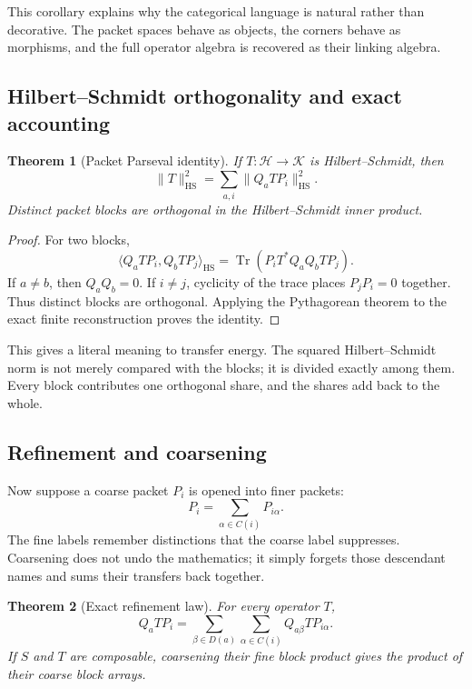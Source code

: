 \documentclass[11pt]{article}
\newtheorem{theorem}{Theorem}[section]
\theoremstyle{definition}
\theoremstyle{remark}
\begin{document}
This corollary explains why the categorical language is natural rather than decorative.  The packet spaces behave as objects, the corners behave as morphisms, and the full operator algebra is recovered as their linking algebra.

\subsection{Hilbert--Schmidt orthogonality and exact accounting}

\begin{theorem}[Packet Parseval identity]
If \(T:\mathcal H\to\mathcal K\) is Hilbert--Schmidt, then
\[
\boxed{
\|T\|_{\mathrm{HS}}^2
=
\sum_{a,i}\|Q_aTP_i\|_{\mathrm{HS}}^2.
}
\]
Distinct packet blocks are orthogonal in the Hilbert--Schmidt inner product.
\end{theorem}

\begin{proof}
For two blocks,
\[
\langle Q_aTP_i,Q_bTP_j\rangle_{\mathrm{HS}}
=
\operatorname{Tr}
\left(P_iT^*Q_aQ_bTP_j\right).
\]
If \(a\ne b\), then \(Q_aQ_b=0\).  If \(i\ne j\), cyclicity of the trace places \(P_jP_i=0\) together.  Thus distinct blocks are orthogonal.  Applying the Pythagorean theorem to the exact finite reconstruction proves the identity.
\end{proof}

This gives a literal meaning to transfer energy.  The squared Hilbert--Schmidt norm is not merely compared with the blocks; it is divided exactly among them.  Every block contributes one orthogonal share, and the shares add back to the whole.

\subsection{Refinement and coarsening}

Now suppose a coarse packet \(P_i\) is opened into finer packets:
\[
P_i=\sum_{\alpha\in C(i)}P_{i\alpha}.
\]
The fine labels remember distinctions that the coarse label suppresses.  Coarsening does not undo the mathematics; it simply forgets those descendant names and sums their transfers back together.

\begin{theorem}[Exact refinement law]
For every operator \(T\),
\[
\boxed{
Q_aTP_i
=
\sum_{\beta\in D(a)}
\sum_{\alpha\in C(i)}
Q_{a\beta}TP_{i\alpha}.
}
\]
If \(S\) and \(T\) are composable, coarsening their fine block product gives the product of their coarse block arrays.
\end{theorem}
\end{document}
